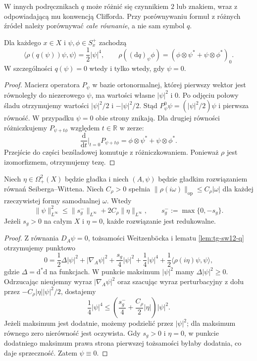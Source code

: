 W innych podręcznikach $q$ może różnić się czynnikiem $2$
lub znakiem, wraz z odpowiadającą mu konwencją Clifforda.
Przy porównywaniu formuł z różnych źródeł należy porównywać
\emph{całe równanie}, a nie sam symbol $q$.

\begin{lemat}
\label{lem:tg-sw12-q}
Dla każdego $x\in X$ i $\psi,\phi\in S_x^+$ zachodzą
\[
\langle\rho(q(\psi))\psi,\psi\rangle=\frac12|\psi|^4,
\qquad
\rho((\mathrm dq)_\psi\phi)
=(\phi\otimes\psi^*+\psi\otimes\phi^*)_0.
\]
W szczególności $q(\psi)=0$ wtedy i tylko wtedy, gdy $\psi=0$.
\end{lemat}

\begin{proof}
Macierz operatora $P_\psi$ w bazie ortonormalnej, której
pierwszy wektor jest równoległy do niezerowego $\psi$,
ma wartości własne $|\psi|^2$ i $0$. Po odjęciu połowy
śladu otrzymujemy wartości $|\psi|^2/2$ i $-|\psi|^2/2$.
Stąd $P_\psi^0\psi=(|\psi|^2/2)\psi$ i pierwsza
równość. W przypadku $\psi=0$ obie strony znikają.
Dla drugiej równości różniczkujemy
$P_{\psi+t\phi}$ względem $t\in\mathbb R$ w zerze:
\[
\frac{\mathrm d}{\mathrm dt}\bigg|_{t=0}P_{\psi+t\phi}
=\phi\otimes\psi^*+\psi\otimes\phi^*.
\]
Przejście do części bezśladowej komutuje z różniczkowaniem.
Ponieważ $\rho$ jest izomorfizmem, otrzymujemy tezę.
\end{proof}

\begin{twierdzenie}
\label{thm:tg-sw12-spinor-bound}
Niech $\eta\in\Omega^2_+(X)$ będzie gładka i niech $(A,\psi)$
będzie gładkim rozwiązaniem równań Seiberga--Wittena.
Niech $C_\rho>0$ spełnia
$\|\rho(i\omega)\|_{\mathrm{op}}\le C_\rho|\omega|$
dla każdej rzeczywistej formy samodualnej $\omega$.
Wtedy
\[
\|\psi\|_{L^\infty}^2\le
\|s_g^-\|_{L^\infty}+2C_\rho\|\eta\|_{L^\infty},
\qquad s_g^-:=\max\{0,-s_g\}.
\]
Jeżeli $s_g>0$ na całym $X$ i $\eta=0$, każde rozwiązanie
jest redukowalne.
\end{twierdzenie}

\begin{proof}
Z równania $D_A\psi=0$, tożsamości Weitzenböcka i
lematu \ref{lem:tg-sw12-q} otrzymujemy punktowo
\[
0=\frac12\Delta|\psi|^2+|\nabla_A\psi|^2
 +\frac{s_g}{4}|\psi|^2+\frac14|\psi|^4
 +\frac12\langle\rho(i\eta)\psi,\psi\rangle,
\]
gdzie $\Delta=\mathrm d^*\mathrm d$ na funkcjach.
W punkcie maksimum $|\psi|^2$ mamy $\Delta|\psi|^2\ge0$.
Odrzucając nieujemny wyraz $|\nabla_A\psi|^2$ oraz
szacując wyraz perturbacyjny z dołu przez
$-C_\rho|\eta||\psi|^2/2$, dostajemy
\[
\frac14|\psi|^4\le
\left(\frac{s_g^-}{4}+\frac{C_\rho}{2}|\eta|\right)
|\psi|^2.
\]
Jeżeli maksimum jest dodatnie, możemy podzielić przez
$|\psi|^2$; dla maksimum równego zero nierówność jest
oczywista. Gdy $s_g>0$ i $\eta=0$, w punkcie dodatniego
maksimum prawa strona pierwszej tożsamości byłaby dodatnia,
co daje sprzeczność. Zatem $\psi\equiv0$.
\end{proof}

